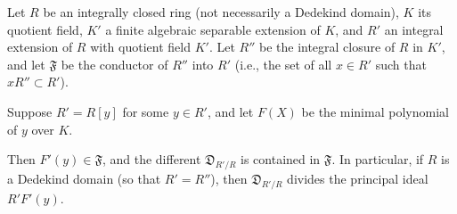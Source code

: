 Let $R$ be an integrally closed ring (not necessarily a Dedekind domain), $K$ its quotient field, $K'$ a finite algebraic separable extension of $K$, and $R'$ an integral extension of $R$ with quotient field $K'$. Let $R''$ be the integral closure of $R$ in $K'$, and let $\mathfrak{F}$ be the conductor of $R''$ into $R'$ (i.e., the set of all $x \in R'$ such that $x R'' \subset R'$).

Suppose $R' = R[y]$ for some $y \in R'$, and let $F(X)$ be the minimal polynomial of $y$ over $K$.

Then $F'(y) \in \mathfrak{F}$, and the different $\mathfrak{D}_{R'/R}$ is contained in $\mathfrak{F}$. In particular, if $R$ is a Dedekind domain (so that $R' = R''$), then $\mathfrak{D}_{R'/R}$ divides the principal ideal $R' F'(y)$.
